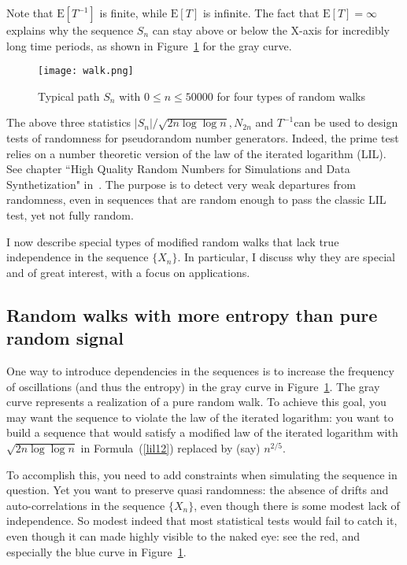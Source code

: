 \documentclass[oneside,10pt]{book}
\begin{document}
\noindent Note that $\text{E}[T^{-1}]$ is finite, while $\text{E}[T]$ is infinite. The fact that
 $\text{E}[T]=\infty$ explains why the sequence $S_n$ can stay above or below the X-axis for incredibly long time periods, as shown
 in Figure~\ref{fig:walk} for the gray curve.

\begin{figure}%
\centering
\texttt{[image: walk.png]}
\caption{Typical path $S_n$ with $0\leq n\leq \num{50000}$ for four types of random walks}
\label{fig:walk}
\end{figure}

The above three statistics $|S_n|/\sqrt{2n\log\log n}, N_{2n}$ and $T^{-1}$can be used to design tests of randomness for
\textcolor{index}{pseudorandom number generators}. Indeed, the \textcolor{index}{prime test}   relies on a number theoretic version of the law of the iterated logarithm (LIL). See chapter ``High Quality Random Numbers for Simulations and Data Synthetization" in~\cite{vgsynthetic}.
The purpose is to detect very weak departures from randomness, even in sequences that are random enough to pass the classic LIL test, yet not fully random.

I now describe special types of modified random walks that lack true independence in the sequence $\{X_n\}$. In particular, I discuss why
 they are special and of great interest, with a focus on applications.


\subsection{Random walks with more entropy than pure random signal}\label{azxa}

One way to introduce dependencies in the sequences is to increase the frequency of oscillations (and thus the entropy) in the gray curve in
 Figure~\ref{fig:walk}. The gray curve represents a realization of a pure random walk.
 To achieve this goal, you may want the sequence to violate the law of the iterated logarithm: you want to build a sequence that would satisfy a modified law of the iterated logarithm with $\sqrt{2n\log\log n}$ in Formula~(\ref{lil12}) replaced by (say) $n^{2/5}$.

To accomplish this, you need to add constraints when simulating the sequence in question.  Yet you want to preserve quasi randomness:
the absence of drifts and auto-correlations in
 the sequence $\{X_n\}$, even though there is some modest lack of independence. So modest indeed that most statistical tests would fail to catch it, even though it can made highly visible to the naked eye: see the red, and especially the blue curve in Figure~\ref{fig:walk}.
\end{document}
